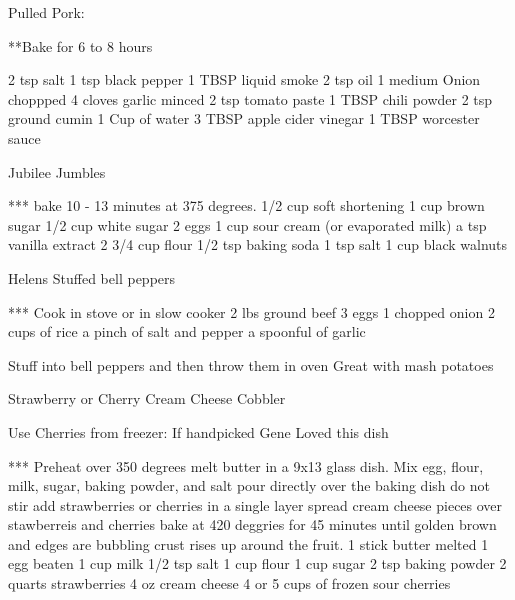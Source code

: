Pulled Pork: 

**Bake for 6 to 8 hours

2 tsp salt 
1 tsp black pepper
1 TBSP liquid smoke
2 tsp oil 
1 medium Onion choppped
4 cloves garlic minced
2 tsp tomato paste 
1 TBSP chili powder
2 tsp ground cumin
1 Cup of water
3 TBSP apple cider vinegar
1 TBSP worcester sauce

Jubilee Jumbles 

*** bake 10 - 13 minutes at 375 degrees.  
1/2 cup soft shortening 
1 cup brown sugar 
1/2 cup white sugar
2 eggs
1 cup sour cream (or evaporated milk)
a tsp vanilla extract
2 3/4 cup flour 
1/2 tsp baking soda
1 tsp salt 
1 cup black walnuts 

Helens Stuffed bell peppers 

*** Cook in stove or in slow cooker
2 lbs ground beef 
3 eggs 
1 chopped onion 
2 cups of rice 
a pinch of salt and pepper 
a spoonful of garlic 
 

Stuff into bell peppers and then throw them in oven 
Great with mash potatoes

Strawberry or Cherry Cream Cheese Cobbler

Use Cherries from freezer: If handpicked 
Gene Loved this dish


*** Preheat over 350 degrees melt butter in a 9x13 glass dish. 
Mix egg, flour, milk, sugar, baking powder, and salt pour directly over the baking dish do not stir
add strawberries or cherries in a single layer spread cream cheese pieces over stawberreis and cherries 
bake at 420 deggries for 45 minutes until golden brown and edges are bubbling crust rises up around the fruit.  
1 stick butter melted
1 egg beaten 
1 cup milk 
1/2 tsp salt 
1 cup flour 
1 cup sugar 
2 tsp baking powder
2 quarts strawberries 
4 oz cream cheese
4 or 5 cups of frozen sour cherries 
